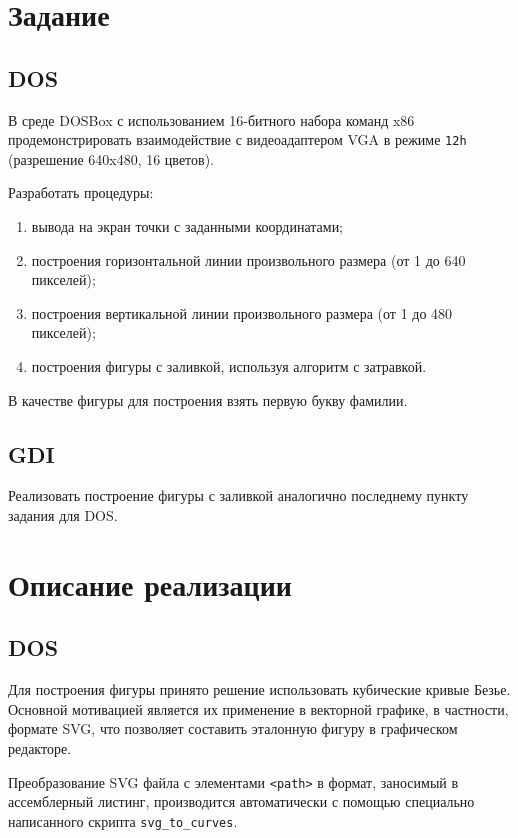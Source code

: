 \documentclass[listings]{labreport}
\begin{document}
\maketitlepage

\section*{Задание}

\subsection*{DOS}

В среде DOSBox с использованием 16-битного набора команд x86 продемонстрировать
взаимодействие с видеоадаптером VGA в режиме \verb|12h| (разрешение 640x480, 16 цветов).

Разработать процедуры:
\begin{enumerate}[noitemsep,topsep=0em]
\item вывода на экран точки с заданными координатами;
\item построения горизонтальной линии произвольного размера (от 1 до 640 пикселей);
\item построения вертикальной линии произвольного размера (от 1 до 480 пикселей);
\item построения фигуры с заливкой, используя алгоритм с затравкой.
\end{enumerate}
\vspace{0.4em}

В качестве фигуры для построения взять первую букву фамилии.

\subsection*{GDI}

Реализовать построение фигуры с заливкой аналогично последнему пункту задания для DOS.

\section*{Описание реализации}

\subsection*{DOS}

Для построения фигуры принято решение использовать кубические кривые Безье.
Основной мотивацией является их применение в векторной графике, в частности, формате SVG,
что позволяет составить эталонную фигуру в графическом редакторе.

Преобразование SVG файла с элементами \verb|<path>| в формат, заносимый в
ассемблерный листинг, производится автоматически с помощью специально написанного скрипта
\verb|svg_to_curves|.
\end{document}
